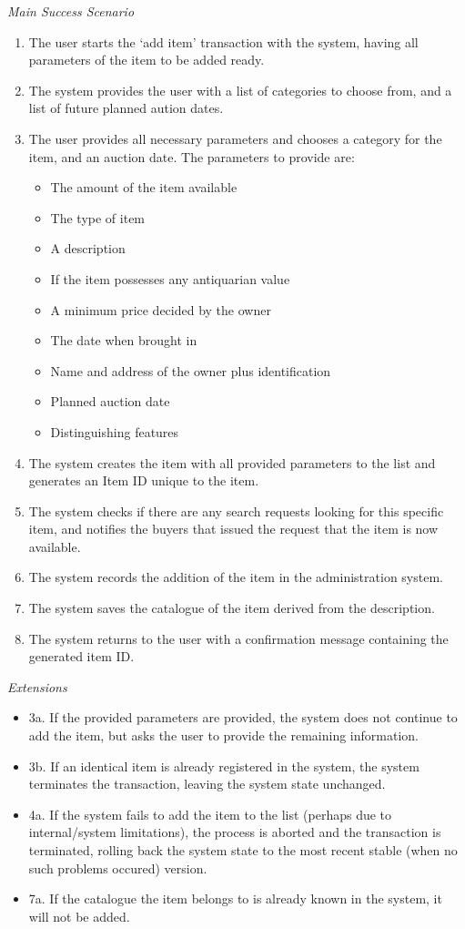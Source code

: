 \textsl{Main Success Scenario}
\begin{enumerate}[noitemsep]
	\item The user starts the `add item' transaction with the system, having all parameters of the item to be added ready.
	\item The system provides the user with a list of categories to choose from, and a list of future planned aution dates.
	\item The user provides all necessary parameters and chooses a category for the item, and an auction date. The parameters to provide are:
	\begin{itemize}[noitemsep]
		\item The amount of the item available
		\item The type of item
		\item A description
		\item If the item possesses any antiquarian value
		\item A minimum price decided by the owner
		\item The date when brought in
		\item Name and address of the owner plus identification
		\item Planned auction date
		\item Distinguishing features
	\end{itemize}
	\item The system creates the item with all provided parameters to the list and generates an Item ID unique to the item.
	\item The system checks if there are any search requests looking for this specific item, and notifies the buyers that issued the request that the item is now available.
	\item The system records the addition of the item in the administration system.
	\item The system saves the catalogue of the item derived from the description.
	\item The system returns to the user with a confirmation message containing the generated item ID.
\end{enumerate}
\textsl{Extensions}
\begin{itemize}[noitemsep]
	\item 3a. If the provided parameters are provided, the system does not continue to add the item, but asks the user to provide the remaining information.
	\item 3b. If an identical item is already registered in the system, the system terminates the transaction, leaving the system state unchanged.
	\item 4a. If the system fails to add the item to the list (perhaps due to internal/system limitations), the process is aborted and the transaction is terminated, rolling back the system state to the most recent stable (when no such problems occured) version.
	\item 7a. If the catalogue the item belongs to is already known in the system, it will not be added.
\end{itemize}
